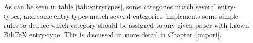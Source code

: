 As can be seen in table \ref{tab:entrytypes}, some categories match
several entry-types, and some entry-types match several categories.
\package{} implements some simple rules to deduce which category
should be assigned to any given paper with known BibTeX
entry-type. This is discussed in more detail in
Chapter~\ref{import}.
